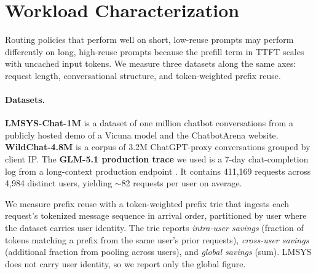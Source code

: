 \documentclass{article}
\begin{document}

\section{Workload Characterization}
\label{sec:characterization}

Routing policies that perform well on short, low-reuse prompts may perform
differently on long, high-reuse prompts because the prefill term in TTFT scales
with uncached input tokens. We measure three datasets along the same axes:
request length, conversational structure, and token-weighted prefix reuse.

\paragraph{Datasets.}
\textbf{LMSYS-Chat-1M} \citep{lmsys2024} is a dataset of one million chatbot conversations from a publicly hosted demo of a Vicuna model and the ChatbotArena website. \textbf{WildChat-4.8M} \citep{wildchat2024} is a corpus
of 3.2M ChatGPT-proxy conversations grouped by client IP. The \textbf{GLM-5.1
production trace} we used is a 7-day chat-completion log from a long-context production
endpoint \citep{glm2024}. It contains 411{,}169 requests across 4{,}984 distinct
users, yielding $\sim$82 requests per user on average.

We measure prefix reuse with a token-weighted prefix trie that ingests each
request's tokenized message sequence in arrival order, partitioned by user where
the dataset carries user identity. The trie reports \textit{intra-user savings}
(fraction of tokens matching a prefix from the same user's prior requests),
\textit{cross-user savings} (additional fraction from pooling across users), and
\textit{global savings} (sum). LMSYS does not carry user identity, so we report
only the global figure.
\end{document}
